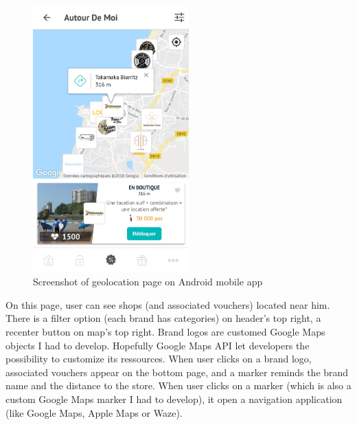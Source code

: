 \documentclass{article}
\begin{document}
                    \begin{figure}[H]
                        \centering
                        \includegraphics[width=6cm]{geolocation_app.jpg}
                        \caption{Screenshot of geolocation page on Android mobile app}
                        \label{fig:app}
                    \end{figure}

                    On this page, user can see shops (and associated vouchers) located near him. There is a filter option (each brand has categories) on
                    header's top right, a recenter button on map's top right. Brand logos are customed Google Maps objects I had to develop. Hopefully Google Maps
                    API let developers the possibility to customize its ressources.
                    When user clicks on a brand logo, associated vouchers appear on the bottom page, and a marker reminds the brand name and the distance to the store.
                    When user clicks on a marker (which is also a custom Google Maps marker I had to develop), it open a navigation application (like Google Maps,
                    Apple Maps or Waze).
                
\end{document}
